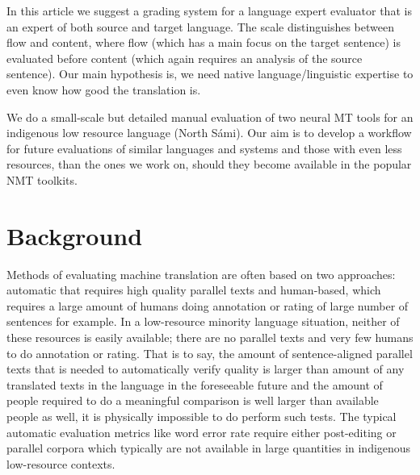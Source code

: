\documentclass{flammie}
\begin{document}
In this article we suggest a grading system for a language expert evaluator that
is an expert of both source and target language. The scale distinguishes between
flow and content, where flow (which has a main focus on the target sentence) is
evaluated before content (which again requires an analysis of the source
sentence).  Our main hypothesis is, we need native language/linguistic expertise
to even know how good the translation is.


We do a small-scale but detailed manual evaluation of two neural MT tools for an
indigenous low resource language (North Sámi).  Our aim is to develop a workflow
for future evaluations of similar languages and systems and those with even less
resources, than the ones we work on, should they become available in the popular
NMT tool\-kits.






































\section{Background}

Methods of evaluating machine translation are often based on two approaches:
automatic that requires high quality parallel texts and human-based, which
requires a large amount of humans doing annotation or rating of large number of
sentences for example.  In a low-resource minority language situation, neither
of these resources is easily available; there are no parallel texts and very few
humans to do annotation or rating.  That is to say, the amount of
sentence-aligned parallel texts that is needed to automatically verify quality
is larger than amount of any translated texts in the language in the foreseeable
future and the amount of people required to do a meaningful comparison is well
larger than available people as well, it is physically impossible to do perform
such tests.  The typical automatic evaluation metrics like word error rate
require either post-editing or parallel corpora which typically are not
available in large quantities in indigenous low-resource contexts.
\end{document}
